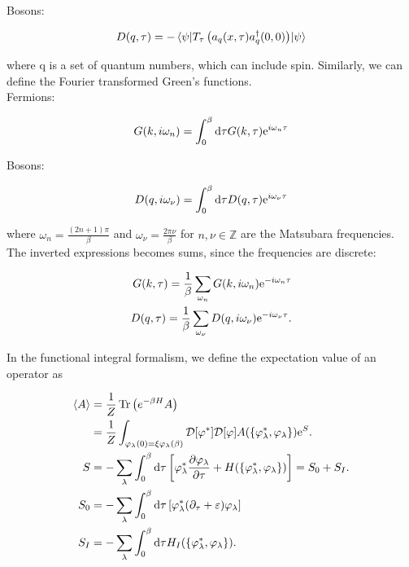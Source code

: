 Bosons: 

\begin{equation*}
    D(q, \tau) = -\mel{\psi}{T_\tau \left(a_q(x,\tau)a_q^{\dagger}(0,0)\right)}{\psi}
\end{equation*}

where q is a set of quantum numbers, which can include spin. Similarly, we can define the Fourier transformed Green's functions. \\ 

Fermions: 

\begin{equation*}
    G(k, i\omega_n) = \int_{0}^{\beta} \dd \tau G(k, \tau) \mathrm{e}^{i\omega_n \tau}
\end{equation*}

Bosons: 

\begin{equation*}
    D(q, i\omega_\nu) = \int_{0}^{\beta} \dd \tau D(q, \tau) \mathrm{e}^{i\omega_\nu\tau}
\end{equation*}

where $\omega_n = \frac{(2n+1)\pi}{\beta}$ and $\omega_\nu = \frac{2\pi \nu}{\beta}$ for $n, \nu \in \mathbb{Z}$ are the Matsubara frequencies. The inverted expressions becomes sums, since the frequencies are discrete: 

\begin{align*}
    G(k, \tau) = \frac{1}{\beta}\sum_{\omega_n}G(k, i\omega_n)\mathrm{e}^{-i\omega_n \tau} \\ 
    D(q,\tau) = \frac{1}{\beta}\sum_{\omega_\nu}D(q, i\omega_\nu)\mathrm{e}^{-i\omega_\nu \tau}. 
\end{align*}

In the functional integral formalism, we define the expectation value of an operator as


    
\begin{align*}
    \expval{A} &= \frac{1}{Z} \Tr \left( e^{-\beta H} A \right) \\
    &= \frac{1}{Z}\int_{\varphi_\lambda(0) = \xi \varphi_\lambda(\beta)} \mathcal{D} [\varphi^*] \mathcal{D}[\varphi]A(\{\varphi_\lambda^*, \varphi_\lambda\})\mathrm{e}^S. \\ 
    S &= - \sum_\lambda \int_{0}^{\beta} \dd \tau \left[ \varphi_\lambda ^* \pdv{\varphi_\lambda}{\tau} + H(\{\varphi_\lambda^*, \varphi_\lambda\})\right] = S_0 + S_I. \\
    S_0 &= - \sum_\lambda \int_{0}^{\beta} \dd \tau \left[ \varphi_\lambda ^* ( \partial_\tau + \varepsilon) \varphi_\lambda\right] \\ 
    S_I &= - \sum_\lambda \int_{0}^{\beta} \dd \tau H_I(\{\varphi_\lambda^*, \varphi_\lambda\}).
\end{align*}

